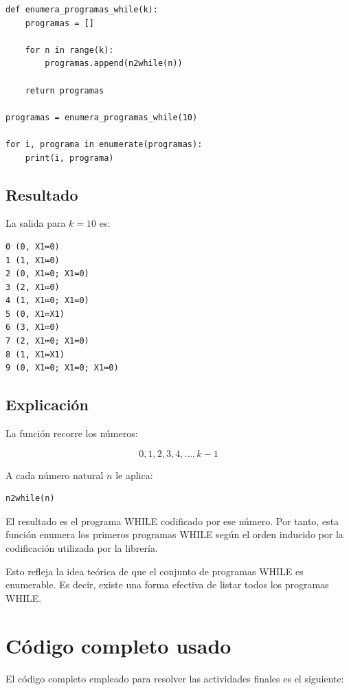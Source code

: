 \documentclass[10pt]{article}
\begin{document}
\begin{verbatim}
def enumera_programas_while(k):
    programas = []

    for n in range(k):
        programas.append(n2while(n))

    return programas

programas = enumera_programas_while(10)

for i, programa in enumerate(programas):
    print(i, programa)
\end{verbatim}

\subsection{Resultado}

La salida para $k=10$ es:

\begin{verbatim}
0 (0, X1≔0)
1 (1, X1≔0)
2 (0, X1≔0; X1≔0)
3 (2, X1≔0)
4 (1, X1≔0; X1≔0)
5 (0, X1≔X1)
6 (3, X1≔0)
7 (2, X1≔0; X1≔0)
8 (1, X1≔X1)
9 (0, X1≔0; X1≔0; X1≔0)
\end{verbatim}

\subsection{Explicación}

La función recorre los números:

\[
    0,1,2,3,4,\dots,k-1
\]

A cada número natural $n$ le aplica:

\begin{verbatim}
n2while(n)
\end{verbatim}

El resultado es el programa WHILE codificado por ese número. Por tanto, esta función enumera los primeros programas WHILE según el orden inducido por la codificación utilizada por la librería.

Esto refleja la idea teórica de que el conjunto de programas WHILE es enumerable. Es decir, existe una forma efectiva de listar todos los programas WHILE.

\section{Código completo usado}

El código completo empleado para resolver las actividades finales es el siguiente:
\end{document}
